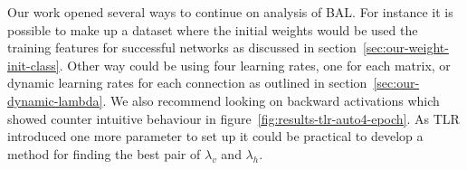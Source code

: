 \label{sec:future-work}
Our work opened several ways to continue on analysis of BAL. For instance it is possible to make up a dataset where the initial weights would be used the training features for successful networks as discussed in section~\ref{sec:our-weight-init-class}. Other way could be using four learning rates, one for each matrix, or dynamic learning rates for each connection as outlined in section~\ref{sec:our-dynamic-lambda}. We also recommend looking on backward activations which showed counter intuitive behaviour in figure~\ref{fig:results-tlr-auto4-epoch}. As TLR introduced one more parameter to set up it could be practical to develop a method for finding the best pair of $\lambda_v$ and $\lambda_h$. 

